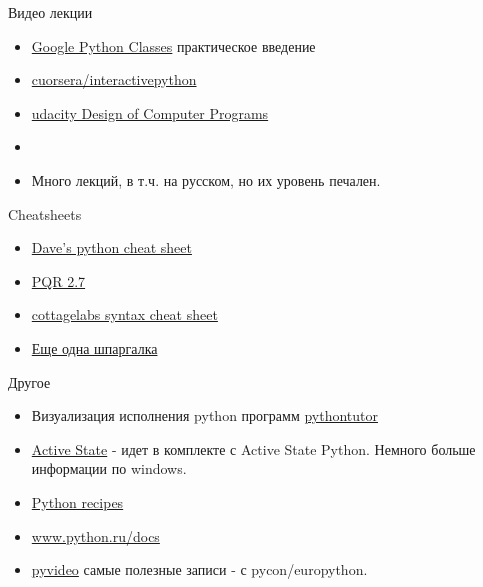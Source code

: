 \documentclass{article}
\begin{document}
\begin{center} Видео лекции \end{center}
\begin{itemize}
	\item \href{http://www.youtube.com/results?search_query=Google+Python+Class}{Google Python Classes} 
	      практическое введение
	\item \href{https://class.coursera.org/interactivepython-2012-001/class/index}{cuorsera/interactivepython}
	\item \href{http://www.udacity.com/overview/Course/cs212/CourseRev/apr2012}{udacity Design of Computer Programs}
	\item 
	\item Много лекций, в т.ч. на русском, но их уровень печален.
\end{itemize}

\begin{center} Cheatsheets \end{center}
\begin{itemize}
	\item \href{http://www.addedbytes.com/cheat-sheets/python-cheat-sheet/}{Dave's python cheat sheet} 
	\item \href{http://rgruet.free.fr/PQR27/PQR2.7_printing_a4.pdf}{PQR 2.7} 
	\item \href{http://cottagelabs.com/news/python-language-syntax-cheat-sheet}{cottagelabs syntax cheat sheet}
	\item \href{http://cheatography.com/sschaub/cheat-sheets/essential-python/}{Еще одна шпаргалка}
\end{itemize}

\begin{center} Другое \end{center}
\begin{itemize}
	\item Визуализация исполнения python программ 
			\href{http://www.pythontutor.com/visualize.html}{pythontutor}
	\item \href{http://www.activestate.com/activepython}{Active State} - идет в комплекте
	      с Active State Python. Немного больше информации по windows. 
	\item \href{http://code.activestate.com/recipes/langs/python/}{Python recipes}
	\item \href{http://www.python.ru/docs/}{www.python.ru/docs}
	\item \href{http://pyvideo.org/}{pyvideo} самые полезные записи - с pycon/europython.
\end{itemize}

\end{document}
